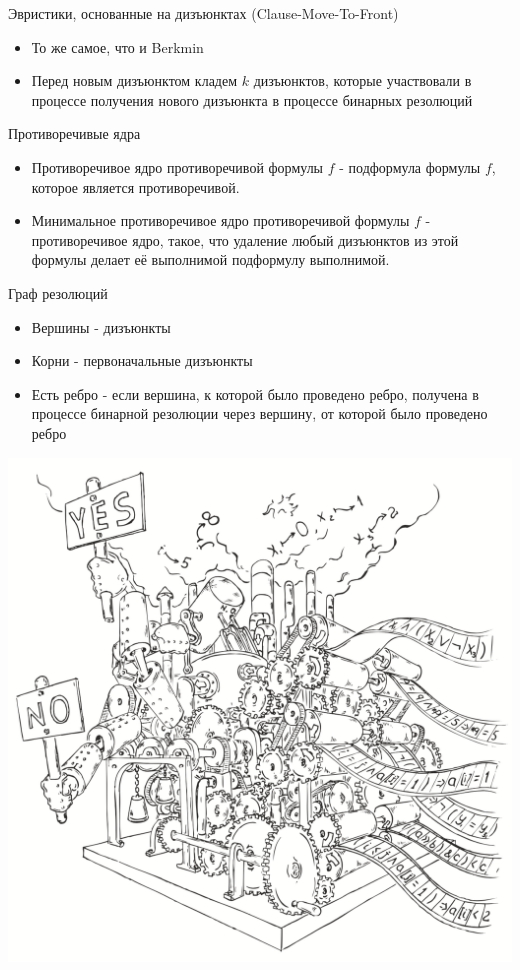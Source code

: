 \documentclass{beamer}
\begin{document}
\begin{frame}{Эвристики, основанные на дизъюнктах (Clause-Move-To-Front)}
\begin{itemize}
\item То же самое, что и Berkmin
\item Перед новым дизъюнктом кладем $k$ дизъюнктов, которые участвовали в процессе получения нового дизъюнкта в процессе
бинарных резолюций
\end{itemize}
\end{frame}

\begin{frame}{Противоречивые ядра}
\begin{itemize}
\item Противоречивое ядро противоречивой формулы $f$ - подформула формулы $f$, которое является противоречивой.
\item Минимальное противоречивое ядро противоречивой формулы $f$ - противоречивое ядро, такое, что удаление любый дизъюнктов из
этой формулы делает её выполнимой подформулу выполнимой.
\end{itemize}
\end{frame}

\begin{frame}{Граф резолюций}
\begin{itemize}
\item Вершины - дизъюнкты
\item Корни - первоначальные дизъюнкты
\item Есть ребро - если вершина, к которой было проведено ребро, получена в процессе бинарной резолюции через вершину, от
которой было проведено ребро
\end{itemize}
\end{frame}
\begin{frame}
\includegraphics[scale=0.5]{../decision-procedure.png}
\end{frame}
\end{document}
